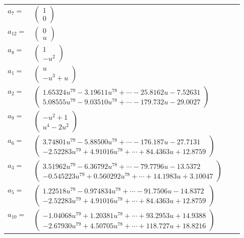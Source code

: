 \documentclass[1p]{elsarticle_modified}
\theoremstyle{definition}
\begin{document}
\begin{tabular}{m{7pt} m{180pt} m{7pt} m{180pt} }
\flushright $a_{7}=$&$\begin{pmatrix}1\\0\end{pmatrix}$ \\
\flushright $a_{12}=$&$\begin{pmatrix}0\\u\end{pmatrix}$ \\
\flushright $a_{8}=$&$\begin{pmatrix}1\\- u^2\end{pmatrix}$ \\
\flushright $a_{1}=$&$\begin{pmatrix}u\\- u^3+u\end{pmatrix}$ \\
\flushright $a_{2}=$&$\begin{pmatrix}1.65324 u^{79}-3.19611 u^{78}+\cdots-25.8162 u-7.52631\\5.08555 u^{79}-9.03510 u^{78}+\cdots-179.732 u-29.0027\end{pmatrix}$ \\
\flushright $a_{9}=$&$\begin{pmatrix}- u^2+1\\u^4-2 u^2\end{pmatrix}$ \\
\flushright $a_{6}=$&$\begin{pmatrix}3.74801 u^{79}-5.88500 u^{78}+\cdots-176.187 u-27.7131\\-2.52283 u^{79}+4.91016 u^{78}+\cdots+84.4363 u+12.8759\end{pmatrix}$ \\
\flushright $a_{3}=$&$\begin{pmatrix}3.51962 u^{79}-6.36792 u^{78}+\cdots-79.7796 u-13.5372\\-0.545223 u^{79}+0.560292 u^{78}+\cdots+14.1983 u+3.10047\end{pmatrix}$ \\
\flushright $a_{5}=$&$\begin{pmatrix}1.22518 u^{79}-0.974834 u^{78}+\cdots-91.7506 u-14.8372\\-2.52283 u^{79}+4.91016 u^{78}+\cdots+84.4363 u+12.8759\end{pmatrix}$ \\
\flushright $a_{10}=$&$\begin{pmatrix}-1.04068 u^{79}+1.20381 u^{78}+\cdots+93.2953 u+14.9388\\-2.67930 u^{79}+4.50705 u^{78}+\cdots+118.727 u+18.8216\end{pmatrix}$ \\

\end{tabular}
\end{document}
